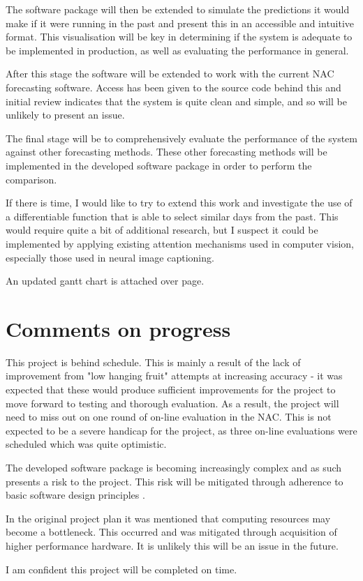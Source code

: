 The software package will then be extended to simulate the predictions it would make if it were running in the past and present this in an accessible and intuitive format.
This visualisation will be key in determining if the system is adequate to be implemented in production, as well as evaluating the performance in general.

After this stage the software will be extended to work with the current NAC forecasting software. 
Access has been given to the source code behind this and initial review indicates that the system is quite clean and simple, and so will be unlikely to present an issue.

The final stage will be to comprehensively evaluate the performance of the system against other forecasting methods.
These other forecasting methods will be implemented in the developed software package in order to perform the comparison.

If there is time, I would like to try to extend this work and investigate the use of a differentiable function that is able to select similar days from the past.
This would require quite a bit of additional research, but I suspect it could be implemented by applying existing attention mechanisms used in computer vision, especially those used in neural image captioning.

An updated gantt chart is attached over page.


\section*{Comments on progress}
This project is behind schedule.
This is mainly a result of the lack of improvement from "low hanging fruit" attempts at increasing accuracy - it was expected that these would produce sufficient improvements for the project to move forward to testing and thorough evaluation.
As a result, the project will need to miss out on one round of on-line evaluation in the NAC.
This is not expected to be a severe handicap for the project, as three on-line evaluations were scheduled which was quite optimistic.

The developed software package is becoming increasingly complex and as such presents a risk to the project.
This risk will be mitigated through adherence to basic software design principles \citep{Haoyu2012}.

In the original project plan it was mentioned that computing resources may become a bottleneck.
This occurred and was mitigated through acquisition of higher performance hardware.
It is unlikely this will be an issue in the future.

I am confident this project will be completed on time.


